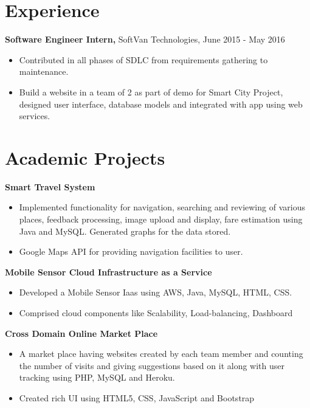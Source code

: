 \documentclass[margin]{res}
\begin{document}
\begin{resume}
\section{Experience}

 
 {\bf Software Engineer Intern,} SoftVan Technologies, \hfill June  2015  - May 2016
 \begin{itemize} \itemsep -1pt  %
 \item Contributed in all phases of SDLC from requirements gathering to maintenance.
  \item Build a website in a team of 2 as part of demo for Smart City Project, designed user interface, database models and integrated with app using web services.
\end{itemize}
 
\section{Academic Projects}
 
 {\bf Smart Travel System }
 \begin{itemize} \itemsep -2pt  %
 \item Implemented functionality for navigation, searching and reviewing of various places, feedback processing, image upload and display, fare estimation using Java and MySQL. Generated graphs for the data stored.
 \item  Google Maps API for providing navigation facilities to user.
 \end{itemize}
 
 {\bf Mobile Sensor Cloud Infrastructure as a Service }
 \begin{itemize} \itemsep -2pt  %
 \item Developed a Mobile Sensor Iaas  using  AWS, Java, MySQL, HTML, CSS.
 \item Comprised cloud components like Scalability, Load-balancing, Dashboard
 \end{itemize}
 
 {\bf Cross Domain Online Market Place}
 \begin{itemize} \itemsep -2pt  %
 \item A market place having websites created by each team member and counting the number of visits and giving suggestions based on it along with user tracking using PHP, MySQL and Heroku.
 \item Created rich UI using HTML5, CSS, JavaScript and Bootstrap 
 \end{itemize}


\end{resume}
\end{document}
